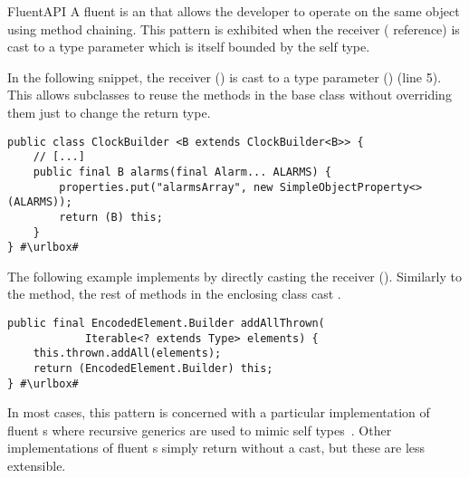 \begin{pattern}{FluentAPI}
A fluent \api{} is an \api{} that allows the developer to operate on the same
object using method chaining.
This pattern is exhibited when the receiver ( reference) is cast to a type parameter which is itself bounded by the self type.


\instances{}
In the following snippet,
the receiver () is cast to a type parameter () (line 5).
This allows subclasses to reuse the methods in the base class without overriding them just to change the return type.

\def\urlvar{http://bit.ly/HanSolo_Medusa_2TyBObH}
\begin{verbatim}
public class ClockBuilder <B extends ClockBuilder<B>> {
    // [...]
    public final B alarms(final Alarm... ALARMS) {
        properties.put("alarmsArray", new SimpleObjectProperty<>(ALARMS));
        return (B) this;
    }
} #\urlbox#
\end{verbatim}

The following example implements \thisp{} by directly casting the receiver ().
Similarly to the  method, the rest of methods in the enclosing class cast .

\def\urlvar{http://bit.ly/immutables_immutables_2S4BoJs}
\begin{verbatim}
public final EncodedElement.Builder addAllThrown(
            Iterable<? extends Type> elements) {
    this.thrown.addAll(elements);
    return (EncodedElement.Builder) this;
} #\urlbox#
\end{verbatim}


\issues{}
In most cases,
this pattern is concerned with a particular implementation of fluent \api{}s
where recursive generics are used to mimic self types~\cite{bruceChallengingTypingIssues2003}.
Other implementations of fluent \api{}s simply return  without a cast, but these are less extensible.

\end{pattern}
